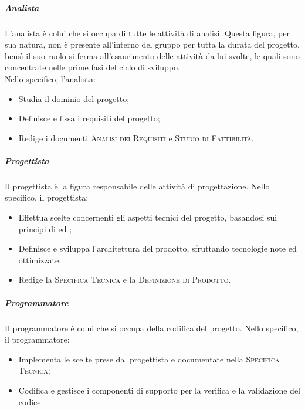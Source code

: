 \documentclass[../norme-di-progetto.tex]{subfiles}
\begin{document}
\subparagraph{Analista}
L'analista è colui che si occupa di tutte le attività di analisi. Questa figura, per sua natura, non è presente all'interno del gruppo per tutta la durata del progetto, bensì il suo ruolo si ferma all'esaurimento delle attività da lui svolte, le quali sono concentrate nelle prime fasi del ciclo di sviluppo. \\
Nello specifico, l'analista:
\begin{itemize}
  \item Studia il dominio del progetto;
  \item Definisce e fissa i requisiti del progetto;
  \item Redige i documenti \textsc{Analisi dei Requisiti} e \textsc{Studio di Fattibilità}.
\end{itemize}

\subparagraph{Progettista}
Il progettista è la figura responsabile delle attività di progettazione. Nello specifico, il progettista:
\begin{itemize}
  \item Effettua scelte concernenti gli aspetti tecnici del progetto, basandosi sui principi di  ed ;
  \item Definisce e sviluppa l'architettura del prodotto, sfruttando tecnologie note ed ottimizzate;
  \item Redige la \textsc{Specifica Tecnica} e la \textsc{Definizione di Prodotto}.
\end{itemize}

\subparagraph{Programmatore}
Il programmatore è colui che si occupa della codifica del progetto. Nello specifico, il programmatore:
\begin{itemize}
  \item Implementa le scelte prese dal progettista e documentate nella \textsc{Specifica Tecnica};
  \item Codifica e gestisce i componenti di supporto per la verifica e la validazione del codice.
\end{itemize}
\end{document}
